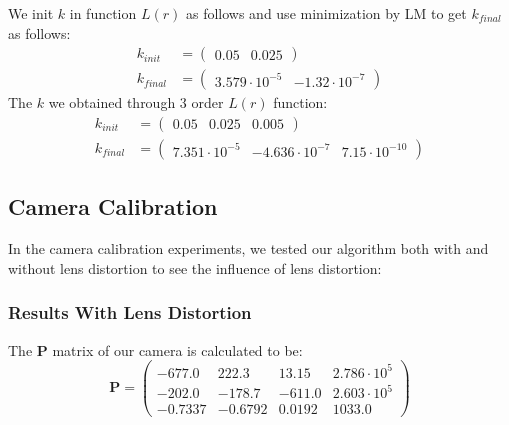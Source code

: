 \documentclass[conference]{IEEEtran}
\newcommand{\mat}[1]{\mathbf{#1}} %
\begin{document}
We init $k$ in function $L(r)$ as follows and use minimization by LM to get $k_{final}$ as follows:
\begin{equation}
\begin{split}
	k_{init} &= \left(\begin{array}{cc} 0.05 & 0.025 \end{array}\right)\\
	k_{final} &= \left(\begin{array}{cc} 3.579\cdot 10^{-5} & -1.32\cdot 10^{-7} \end{array}\right)
\end{split}
\end{equation}
The $k$ we obtained through 3 order $L(r)$ function:
\begin{equation}
	\begin{split}
		k_{init} &= \left(\begin{array}{ccc} 0.05 & 0.025 & 0.005 \end{array}\right)\\
		k_{final} &= \left(\begin{array}{ccc} 7.351\cdot 10^{-5} & -4.636\cdot 10^{-7} & 7.15\cdot 10^{-10} \end{array}\right)
	\end{split}
\end{equation}

\subsection{Camera Calibration}
In the camera calibration experiments, we tested our algorithm both with and without lens distortion to see the influence of lens distortion:
\subsubsection{Results With Lens Distortion}
The $\mat{P}$ matrix of our camera is calculated to be:
\begin{equation}
	\mat{P} = \left(\begin{array}{cccc} -677.0 & 222.3 & 13.15 & 2.786\cdot 10^5\\ -202.0 & -178.7 & -611.0 & 2.603\cdot 10^5\\ -0.7337 & -0.6792 & 0.0192 & 1033.0 \end{array}\right)
\end{equation}
\end{document}
